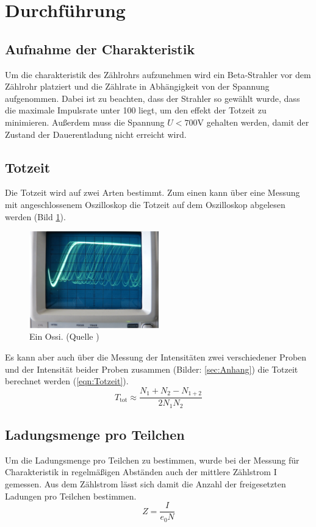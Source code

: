 \section{Durchführung}
\label{sec:Durchfuehrung}
\subsection{Aufnahme der Charakteristik}
Um die charakteristik des Zählrohrs aufzunehmen wird ein Beta-Strahler vor dem Zählrohr platziert und die Zählrate in Abhängigkeit von der Spannung aufgenommen.
Dabei ist zu beachten, dass der Strahler so gewählt wurde, dass die maximale Impulsrate unter 100  liegt, um den effekt der Totzeit zu minimieren.
Außerdem muss die Spannung $U < 700\text{V}$ gehalten werden, damit der Zustand der Dauerentladung nicht erreicht wird.
\subsection{Totzeit}
Die Totzeit wird auf zwei Arten bestimmt.
Zum einen kann über eine Messung mit angeschlossenem Oszilloskop die Totzeit auf dem Oszilloskop abgelesen werden (Bild \ref{fig:Oszilloskop}).
\begin{figure}
    \centering
    \includegraphics[width=0.5\textwidth]{bilder/Oszilloskop.png}
    \caption{Ein Ossi. (Quelle \cite{Anleitung})}
    \label{fig:Oszilloskop}
\end{figure}
Es kann aber auch über die Messung der Intensitäten zwei verschiedener Proben und der Intensität beider Proben zusammen (Bilder: \ref{sec:Anhang}) die Totzeit berechnet werden (\ref{eqn:Totzeit}).
\begin{equation}
    T_{\text{tot}} ≈ \frac{N_{1}+N_{2}-N_{1+2}}{2N_1N_2}
\end{equation}
\subsection{Ladungsmenge pro Teilchen}
Um die Ladungsmenge pro Teilchen zu bestimmen, wurde bei der Messung für Charakteristik in regelmäßigen Abständen auch der mittlere Zählstrom I gemessen.
Aus dem Zählstrom lässt sich damit die Anzahl der freigesetzten Ladungen pro Teilchen bestimmen.
\begin{equation}
    Z = \frac{I}{e_0N}
\end{equation}